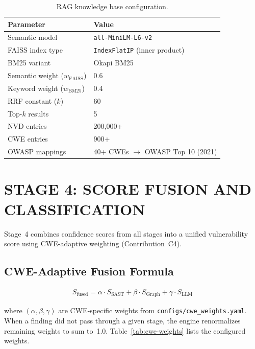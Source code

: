 \begin{table}[H]
\centering
\small
\caption{RAG knowledge base configuration.}
\label{tab:rag-config}
\begin{tabular}{ll}
\toprule
\textbf{Parameter} & \textbf{Value} \\
\midrule
Semantic model & \texttt{all-MiniLM-L6-v2} \\
FAISS index type & \texttt{IndexFlatIP} (inner product) \\
BM25 variant & Okapi BM25 \\
Semantic weight ($w_{\text{FAISS}}$) & 0.6 \\
Keyword weight ($w_{\text{BM25}}$) & 0.4 \\
RRF constant ($k$) & 60 \\
Top-$k$ results & 5 \\
NVD entries & 200,000+ \\
CWE entries & 900+ \\
OWASP mappings & 40+ CWEs $\to$ OWASP Top 10 (2021) \\
\bottomrule
\end{tabular}
\end{table}

\section{\uppercase{Stage 4: Score Fusion and Classification}}
\label{sec:fusion}

Stage~4 combines confidence scores from all stages into a unified vulnerability score using CWE-adaptive weighting (Contribution~C4).

\subsection{CWE-Adaptive Fusion Formula}

\begin{align}
S_{\text{fused}} = \alpha \cdot S_{\text{SAST}} + \beta \cdot S_{\text{Graph}} + \gamma \cdot S_{\text{LLM}}
\label{eq:fusion}
\end{align}

\noindent where $(\alpha, \beta, \gamma)$ are CWE-specific weights from \texttt{configs/cwe\_weights.yaml}. When a finding did not pass through a given stage, the engine renormalizes remaining weights to sum to~1.0. Table~\ref{tab:cwe-weights} lists the configured weights.


